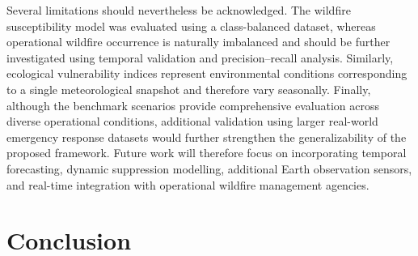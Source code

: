 \documentclass{ieeeaccess}
\begin{document}
Several limitations should nevertheless be acknowledged. The wildfire susceptibility model was evaluated using a class-balanced dataset, whereas operational wildfire occurrence is naturally imbalanced and should be further investigated using temporal validation and precision--recall analysis. Similarly, ecological vulnerability indices represent environmental conditions corresponding to a single meteorological snapshot and therefore vary seasonally. Finally, although the benchmark scenarios provide comprehensive evaluation across diverse operational conditions, additional validation using larger real-world emergency response datasets would further strengthen the generalizability of the proposed framework. Future work will therefore focus on incorporating temporal forecasting, dynamic suppression modelling, additional Earth observation sensors, and real-time integration with operational wildfire management agencies.


\section{Conclusion}
\end{document}
